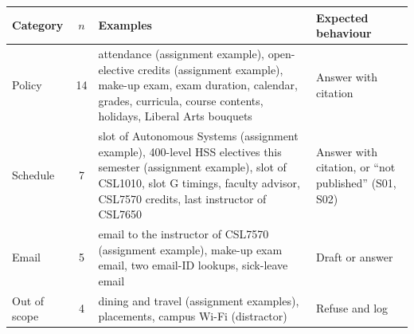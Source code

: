 \documentclass[11pt,a4paper]{article}
\begin{document}
\medskip
\begin{tabularx}{\textwidth}{@{}lcYY@{}}
\toprule
Category & $n$ & Examples & Expected behaviour \\ \midrule
Policy & 14 & attendance (assignment example), open-elective credits (assignment example), make-up exam, exam duration, calendar, grades, curricula, course contents, holidays, Liberal Arts bouquets & Answer with citation \\
Schedule & 7 & slot of Autonomous Systems (assignment example), 400-level HSS electives this semester (assignment example), slot of CSL1010, slot G timings, faculty advisor, CSL7570 credits, last instructor of CSL7650 & Answer with citation, or ``not published'' (S01, S02) \\
Email & 5 & email to the instructor of CSL7570 (assignment example), make-up exam email, two email-ID lookups, sick-leave email & Draft or answer \\
Out of scope & 4 & dining and travel (assignment examples), placements, campus Wi-Fi (distractor) & Refuse and log \\
\bottomrule
\end{tabularx}
\end{document}

